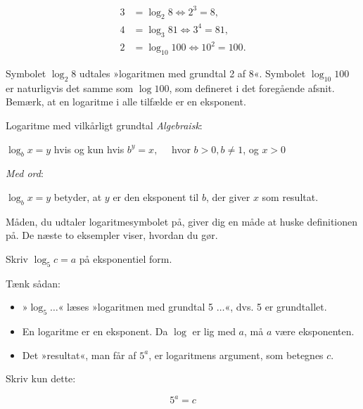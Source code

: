 \[
\begin{aligned}
3 &= \log_2 8 \Leftrightarrow 2^3 = 8, \\
4 &= \log_3 81 \Leftrightarrow 3^4 = 81, \\
2 &= \log_{10} 100 \Leftrightarrow 10^2 = 100.
\end{aligned}
\]

Symbolet \(\log_2 8\) udtales »logaritmen med grundtal 2 af 8«. Symbolet \(\log_{10} 100\) er naturligvis det samme som \(\log 100\), som defineret i det foregående afsnit. Bemærk, at en logaritme i alle tilfælde er en eksponent.

\begin{definition}{Logaritme med vilkårligt grundtal}
\textit{Algebraisk}:

\hspace{1cm}$\log _b x=y$ hvis og kun hvis $b^y=x, \quad$ hvor $b>0, b \neq 1$, og $x>0$

\vspace{0.3cm}

\textit{Med ord}:

\hspace{1cm} $\log _b x=y$ betyder, at $y$ er den eksponent til $b$, der giver $x$ som resultat.
    
\end{definition}

Måden, du udtaler logaritmesymbolet på, giver dig en måde at huske definitionen på. De næste to eksempler viser, hvordan du gør.

\begin{example} Skriv $\log _5 c=a$ på eksponentiel form.

\begin{solution}

Tænk sådan:
\begin{itemize}
    \item »\(\log_5 \ldots\)« læses »logaritmen med grundtal 5 \(\ldots\)«, dvs. 5 er grundtallet.
    \item En logaritme er en eksponent. Da \(\log\) er lig med \(a\), må \(a\) være eksponenten.
    \item Det »resultat«, man får af \(5^a\), er logaritmens argument, som betegnes \(c\).
\end{itemize}

Skriv kun dette: 

\[
5^a = c
\]
\end{solution}
\end{example}

